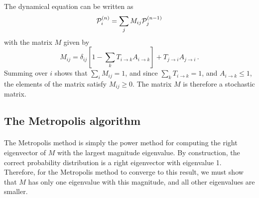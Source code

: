 \documentclass[%
twoside,                 %
final,                   %
10pt]{article}
\begin{document}
The dynamical equation can be written as
\[
{\cal P}^{(n)}_i = \sum_j M_{ij}{\cal P}^{(n-1)}_j
\]
with the matrix $M$ given by
\[
M_{ij} = \delta_{ij}\left [ 1 -\sum_k T_{i\rightarrow k} A_{i \rightarrow k}
\right ] + T_{j\rightarrow i} A_{j\rightarrow i} \,.
\]
Summing over $i$ shows that $\sum_i M_{ij} = 1$, and since
$\sum_k T_{i\rightarrow k} = 1$, and $A_{i \rightarrow k} \leq 1$, the
elements of the matrix satisfy $M_{ij} \geq 0$. The matrix $M$ is therefore
a stochastic matrix.




\subsection*{The Metropolis algorithm}

\paragraph{}
The Metropolis method is simply the power method for computing the
right eigenvector of $M$ with the largest magnitude eigenvalue.
By construction, the correct probability distribution is a right eigenvector
with eigenvalue 1. Therefore, for the Metropolis method to converge
to this result, we must show that $M$ has only one eigenvalue with this
magnitude, and all other eigenvalues are smaller.







\printindex
\end{document}
